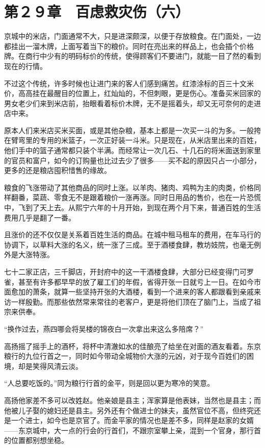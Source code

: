 \section{第２９章　百虑救灾伤（六）}

京城中的米店，门面通常不大，只是进深颇深，以便于存放粮食。在门面处，一边都挂出一溜木牌，上面写着当下的粮价。同时在亮出来的样品上，也会插个价格牌。在商行中少有的明码标价的传统，使得顾客们不要进门，就能一目了然的看到现在的行情。

不过这个传统，许多时候也让进门来的客人们感到痛苦。红漆涂标的百三十文米价，高高挂在最醒目的位置上，红灿灿的，不但刺眼，更是伤心。准备买米回家的男女老少们来到米店前，抬眼看着标价木牌，无不是摇着头，却又无可奈何的走进店中来。

原本人们来米店买米买面，或是其他杂粮，基本上都是一次买一斗的为多。一般挎在臂弯里的专用的米篮子，一次正好装一斗米。只是现在，从米店里出来的百姓，他们手中的篮子通常都只装个半满。而经常让一次几石、十几石的将米面送到家里的官员和富户，如今的订购量也比过去少了很多——买不起的原因只占一小部分，更多的还是粮店囤积惜售的缘故。

粮食的飞涨带动了其他商品的同时上涨。以羊肉、猪肉、鸡鸭为主的肉类，价格同样翻番，菜蔬、零食无不是跟着粮价一涨再涨。同时日用品的售价，也在一片恐慌中，飞到了天上去。从熙宁六年的十月开始，到现在两个月下来，普通百姓的生活费用几乎是翻了一番。

且涨价的还不仅仅是关系着百姓生活的商品。在城中租马租车的费用，在车马行的协调下，以草料大涨的名义，统一涨了三成。至于酒楼食肆，教坊妓院，也毫无例外是大涨特涨。

七十二家正店，三千脚店，开封府中的这一干酒楼食肆，大部分已经变得门可罗雀，甚至有许多都早早的放了雇工们的年假，省得开张一日就亏上一日。在如今市面愈加的萧条，就算一些坚持开张的大酒楼，看到一个进来的客人都跟看到亲戚来访一样殷勤。而那些依然常来常往的老客户，更是将他们顶在了脑门上，当成了祖宗来供奉。

“换作过去，燕四哪会将吴楼的锦夜白一次拿出来这么多陪席？”

高扬摇了摇手上的酒杯，将杯中清澈如水的佳酿亮了给坐在对面的酒友看着。东京粮行的九位行首之一，同时如今带动全城物价大涨的元凶，对于现今百姓们的困境，却是笑得风清云淡。

“人总要吃饭的。”同为粮行行首的金平，则是回以更为寒冷的笑意。

高扬他家差不多可以改姓赵。他亲娘是县主；浑家算是他表妹，当然也是县主；而他被儿子娶的媳妇还是县主。另外还有个做进士的妹夫，虽然官位不高，但终究还是一个进士，如今也是京官了。而金平家的情况也是差不多，同样是赵家的女婿——东京城中，大一点的行会的行首们，不跟宗室攀上亲，混到一个官身，那行首的位置都别想坐稳。

